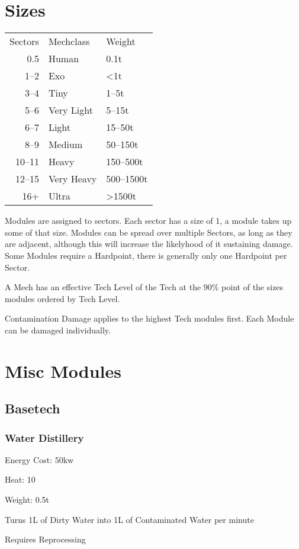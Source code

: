 \section{Sizes}\label{sec:sizes}

\begin{tabular}{r|ll}
    Sectors &Mechclass & Weight\\
    0.5 &Human & 0.1t\\
    1--2 &Exo& <1t\\
    3--4 &Tiny & 1--5t\\
    5--6 &Very Light& 5--15t\\
    6--7 &Light& 15--50t\\
    8--9 &Medium& 50--150t\\
    10--11 &Heavy& 150--500t\\
    12--15 &Very Heavy& 500--1500t\\
    16+ &Ultra& >1500t\\
\end{tabular}\par
Modules are assigned to sectors.
Each sector has a size of 1, a module takes up some of that size.
Modules can be spread over multiple Sectors, as long as they are adjacent, although this will increase the likelyhood
of it sustaining damage.
Some Modules require a Hardpoint, there is generally only one Hardpoint per Sector.\par
A Mech has an effective Tech Level of the Tech at the 90\% point of the sizes modules ordered by Tech Level.\par
Contamination Damage applies to the highest Tech modules first.
Each Module can be damaged individually.\par



\section{Misc Modules}\label{sec:miscmodules}
\par
\subsection{Basetech}\label{subsec:basetech}
\subsubsection{Water Distillery}\label{subsubsec:water-distillery}
Energy Cost: 50kw\par
Heat: 10\par
Weight: 0.5t\par
Turns 1L of Dirty Water into 1L of Contaminated Water per minute\par
Requires Reprocessing\par
\par

